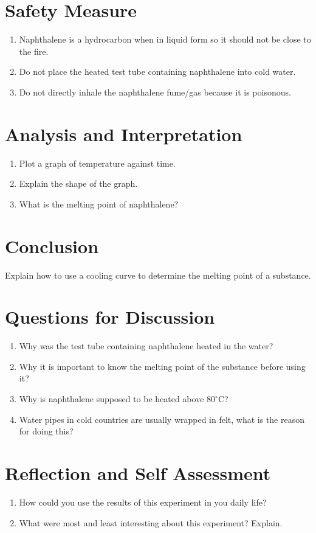 
\section{Safety Measure}
\begin{enumerate}
\item Naphthalene is a hydrocarbon when in liquid form so it should not be close to the fire.
\item Do not place the heated test tube containing naphthalene into cold water.
\item Do not directly inhale the naphthalene fume\slash gas because it is poisonous.
\end{enumerate}

\section{Analysis and Interpretation}
\begin{enumerate}
\item Plot a graph of temperature against time.
\item Explain the shape of the graph.
\item What is the melting point of naphthalene?
\end{enumerate}

\section{Conclusion}
Explain how to use a cooling curve to determine the melting point of a substance.

\section{Questions for Discussion}
\begin{enumerate}
\item Why was the test tube containing naphthalene heated in the water?
\item Why it is important to know the melting point of the substance before using it?
\item Why is naphthalene supposed to be heated above $80^\circ$C?
\item Water pipes in cold countries are usually wrapped in felt, what is the reason for doing this?
\end{enumerate}

\section{Reflection and Self Assessment}
\begin{enumerate}
\item How could you use the results of this experiment in you daily life?
\item What were most and least interesting about this experiment? Explain.
\end{enumerate}